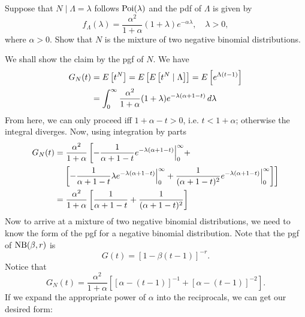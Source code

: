 \documentclass[notoc,notitlepage]{tufte-book}
\begin{document}
\begin{eg}
  Suppose that $N \mid \Lambda = \lambda$ follows $\operatorname{Poi}(\lambda)$ and the pdf of $\Lambda$ is given by
  \begin{equation*}
    f_\Lambda(\lambda) = \frac{\alpha^2}{1 + \alpha}( 1 + \lambda ) e^{-\alpha\lambda}, \quad \lambda > 0,
  \end{equation*}
  where $\alpha > 0$. Show that $N$ is the mixture of two negative binomial distributions.
\end{eg}

\begin{solution}
  We shall show the claim by the pgf of $N$. We have
  \begin{align*}
    G_N(t) &= E \left[ t^N \right] = E \left[ E \left[ t^N \mid \Lambda \right] \right] = E \left[ e^{\Lambda ( t - 1 )} \right] \\
           &= \int_{0}^{\infty} \frac{\alpha^2}{1 + \alpha} ( 1 + \lambda ) e^{-\lambda( \alpha + 1 - t )} \mathop{}\!d{\lambda}
  \end{align*}
  From here, we can only proceed iff $1 + \alpha - t > 0$, i.e. $t < 1 + \alpha$; otherwise the integral diverges. Now, using integration by parts
  \begin{align*}
    G_N(t) &= \frac{\alpha^2}{1 + \alpha} \left[ - \frac{1}{\alpha + 1 - t} e^{-\lambda (\alpha + 1 - t)} \Big|_{0}^{\infty} + \right. \\
           &\quad \left. \left[ - \frac{1}{\alpha + 1 - t} \lambda e^{-\lambda(\alpha + 1 - t)} \Big|_{0}^{\infty} + \frac{1}{(\alpha + 1 - t)^2} e^{-\lambda(\alpha + 1 - t)} \Big|_{0}^{\infty} \right] \right] \\
           &= \frac{\alpha^2}{1 + \alpha} \left[ \frac{1}{\alpha + 1 - t} + \frac{1}{( \alpha + 1 - t )^2} \right]
  \end{align*}
  Now to arrive at a mixture of two negative binomial distributions, we need to know the form of the pgf for a negative binomial distribution. Note that the pgf of $\operatorname{NB}(\beta, r)$ is
  \begin{equation*}
    G(t) = \left[ 1 - \beta( t - 1 ) \right]^{-r}.
  \end{equation*}
  Notice that
  \begin{equation*}
    G_N(t) = \frac{\alpha^2}{1 + \alpha} \left[ [ \alpha - ( t - 1 ) ]^{-1} + [ \alpha - ( t - 1 ) ]^{-2} \right].
  \end{equation*}
  If we expand the appropriate power of $\alpha$ into the reciprocals, we can get our desired form:
  \begin{equation*}

\end{equation*}
\end{solution}
\end{document}
